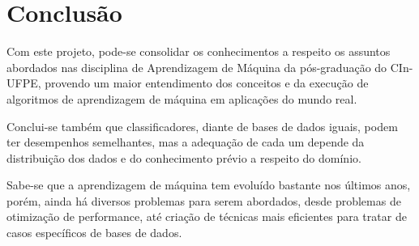 \chapter{Conclusão}
\label{ch:conclusao}

Com este projeto, pode-se consolidar os conhecimentos a respeito os assuntos abordados nas disciplina de Aprendizagem de Máquina da pós-graduação do CIn-UFPE, provendo um maior entendimento dos conceitos e da execução de algoritmos de aprendizagem de máquina em aplicações do mundo real.

Conclui-se também que classificadores, diante de bases de dados iguais, podem ter desempenhos semelhantes, mas a adequação de cada um depende da distribuição dos dados e do conhecimento prévio a respeito do domínio.

Sabe-se que a aprendizagem de máquina tem evoluído bastante nos últimos anos, porém, ainda há diversos problemas para serem abordados, desde problemas de otimização de performance, até criação de técnicas mais eficientes para tratar de casos específicos de bases de dados.

